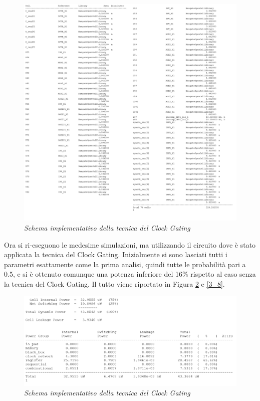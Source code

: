 \begin{figure}[!htb]
	\centering
	\includegraphics[scale=0.65]{immagini/3_6}
	\caption{\textit{Schema implementativo della tecnica del Clock Gating}}
	\label{3_6}
\end{figure}
\newpage
Ora si ri-eseguono le medesime simulazioni, ma utilizzando il circuito dove è stato applicata la tecnica del Clock Gating. Inizialmente si sono lasciati tutti i parametri esattamente come la prima analisi, quindi tutte le probabilità pari a 0.5, e si è ottenuto comunque una potenza inferiore del 16\% rispetto al caso senza la tecnica del Clock Gating. Il tutto viene riportato in Figura \ref{3_7} e \ref{3_8}. \\
\begin{figure}[!htb]
	\centering
	\includegraphics[scale=0.65]{immagini/3_7}
	\caption{\textit{Schema implementativo della tecnica del Clock Gating}}
	\label{3_7}
\end{figure}
